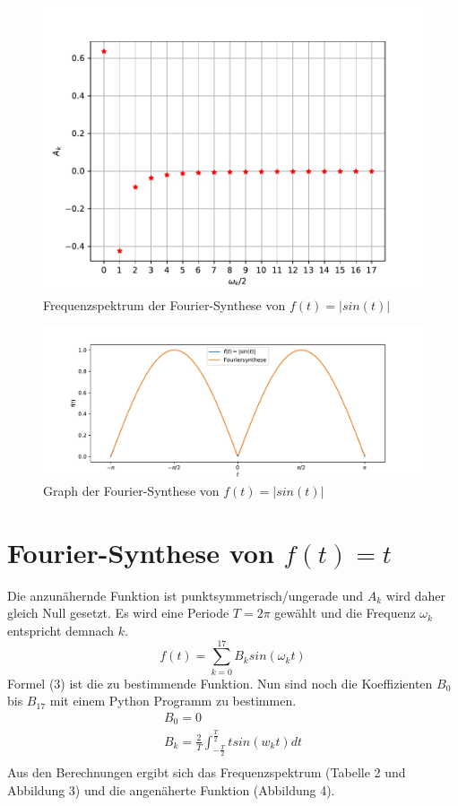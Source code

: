 \documentclass[titlepage = firstcover]{scrartcl}
\begin{document}
    \begin{figure}[H]
        \centering
        \includegraphics[width=0.9\linewidth]{Freqspek_y=|sin(x)|.pdf}
        \caption{Frequenzspektrum der Fourier-Synthese von $f(t)=|sin(t)|$}
    \end{figure}
    \begin{figure}[H]
        \centering
        \includegraphics[width=1.2\linewidth]{plot_sin.pdf}
        \vspace{-5mm}
        \caption{Graph der Fourier-Synthese von $f(t)=|sin(t)|$}
    \end{figure}



    \section{Fourier-Synthese von $f(t)=t$}
    Die anzunähernde Funktion ist punktsymmetrisch/ungerade und $A_k$ wird daher gleich Null gesetzt. Es wird eine Periode $T=2\pi$ gewählt 
    und die Frequenz $\omega_k$ entspricht demnach $k$.
    \begin{equation}
        f(t) = \sum_{k=0}^{17} B_k sin(\omega_k t)
    \end{equation} 
    Formel (3) ist die zu bestimmende Funktion. Nun sind noch die Koeffizienten $B_0$ bis $B_{17}$ mit einem Python Programm zu bestimmen.
    \begin{gather*}
        B_0 = 0 \\
        B_k = \frac{2}{T} \int_{-\frac{T}{2}}^{\frac{T}{2}} t sin(w_k t)dt \\
    \end{gather*}
    Aus den Berechnungen ergibt sich das Frequenzspektrum (Tabelle 2 und Abbildung 3) und die angenäherte Funktion (Abbildung 4).
    
\end{document}
